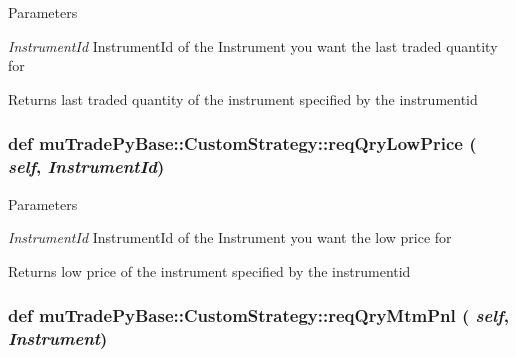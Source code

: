 \begin{DoxyParams}{Parameters}
\item[{\em InstrumentId}]InstrumentId of the Instrument you want the last traded quantity for \end{DoxyParams}
\begin{DoxyReturn}{Returns}
last traded quantity of the instrument specified by the instrumentid 
\end{DoxyReturn}
\hypertarget{classmuTradePyBase_1_1CustomStrategy_aaa79b2efd9d3edba03a3eccff9e59c18}{
\subsubsection[{reqQryLowPrice}]{\setlength{\rightskip}{0pt plus 5cm}def muTradePyBase::CustomStrategy::reqQryLowPrice ( {\em self}, \/   {\em InstrumentId})}}
\label{classmuTradePyBase_1_1CustomStrategy_aaa79b2efd9d3edba03a3eccff9e59c18}

\begin{DoxyParams}{Parameters}
\item[{\em InstrumentId}]InstrumentId of the Instrument you want the low price for \end{DoxyParams}
\begin{DoxyReturn}{Returns}
low price of the instrument specified by the instrumentid 
\end{DoxyReturn}
\hypertarget{classmuTradePyBase_1_1CustomStrategy_a72d97c769d9d74c968e20ef5208b86e1}{
\subsubsection[{reqQryMtmPnl}]{\setlength{\rightskip}{0pt plus 5cm}def muTradePyBase::CustomStrategy::reqQryMtmPnl ( {\em self}, \/   {\em Instrument})}}
\label{classmuTradePyBase_1_1CustomStrategy_a72d97c769d9d74c968e20ef5208b86e1}


